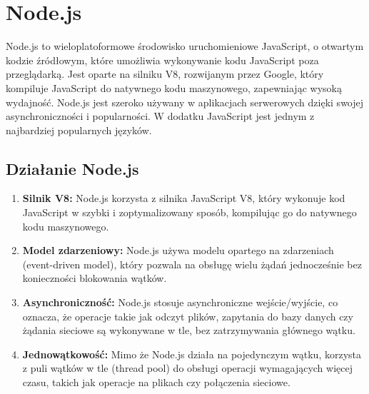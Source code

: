 \section{Node.js}
\label{section:Node.js}
Node.js \cite{Node.js} to wieloplatoformowe środowisko uruchomieniowe JavaScript, o otwartym kodzie źródłowym, które umożliwia wykonywanie kodu JavaScript poza przeglądarką. Jest oparte na silniku V8, rozwijanym przez Google, który kompiluje JavaScript do natywnego kodu maszynowego, zapewniając wysoką wydajność.
Node.js jest szeroko używany w aplikacjach serwerowych dzięki swojej asynchroniczności i popularności.  W dodatku JavaScript jest jednym z najbardziej popularnych języków.
\subsection{Działanie Node.js}
\begin{enumerate}
    \item \textbf{Silnik V8:} Node.js korzysta z silnika JavaScript V8, który wykonuje kod JavaScript w szybki i zoptymalizowany sposób, kompilując go do natywnego kodu maszynowego.
    \item \textbf{Model zdarzeniowy:} Node.js używa modelu opartego na zdarzeniach (event-driven model), który pozwala na obsługę wielu żądań jednocześnie bez konieczności blokowania wątków.
    \item \textbf{Asynchroniczność:} Node.js stosuje asynchroniczne wejście/wyjście, co oznacza, że operacje takie jak odczyt plików, zapytania do bazy danych czy żądania sieciowe są wykonywane w tle, bez zatrzymywania głównego wątku.
    \item \textbf{Jednowątkowość:} Mimo że Node.js działa na pojedynczym wątku, korzysta z puli wątków w tle (thread pool) do obsługi operacji wymagających więcej czasu, takich jak operacje na plikach czy połączenia sieciowe.
\end{enumerate}

